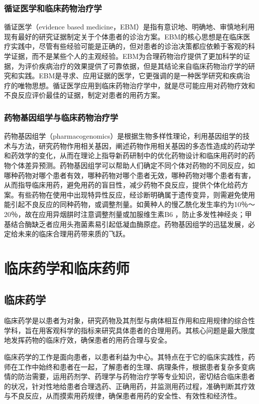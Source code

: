 \subsubsection{循证医学和临床药物治疗学}

循证医学（evidence based
medicine，EBM）是指有意识地、明确地、审慎地利用现有最好的研究证据制定关于个体患者的诊治方案。EBM的核心思想是在临床医疗实践中，尽管有些经验可能是正确的，但对患者的诊治决策都应依赖于客观的科学证据，而不是某些个人的主观经验。EBM为合理药物治疗提供了更加科学的证据，为评价疾病治疗的效果提供了可靠依据，但是其结论来自临床药物治疗学的研究和实践。EBM是寻求、应用证据的医学，它更强调的是一种医学研究和疾病治疗的唯物思想。循证医学应用到临床药物治疗学中，就是尽可能应用对药物疗效和不良反应评价最佳的证据，制定对患者的用药方案。

\subsubsection{药物基因组学与临床药物治疗学}

药物基因组学（pharmacogenomics）是根据生物多样性理论，利用基因组学的技术与方法，研究药物作用相关基因，阐述药物作用相关基因的多态性造成的药动学和药效学的变化，从而在理论上指导新药研制中的优化药物设计和临床用药时的药物个体差异预测。药物基因组学可以帮助人们确定不同个体对药物的不同反应，如哪种药物对哪个患者有效，哪种药物对哪个患者无效，哪种药物对哪个患者有害，从而指导临床用药，避免用药的盲目性，减少药物不良反应，提供个体化给药方案。有些药物在使用中出现特异性反应，经诊断明确属于遗传变异，则需避免使用能引起不良反应的同种药物，或调整剂量。如黄种人的慢乙酰化发生率约为10％～20％，故在应用异烟肼时注意调整剂量或加服维生素B{6}
，防止多发性神经炎；甲基结合酶缺乏者应用头孢菌素易引起低凝血酶原症。药物基因组学的迅猛发展，必定给未来的临床合理用药带来质的飞跃。

\section{临床药学和临床药师}

\subsection{临床药学}

临床药学是以患者为对象，研究药物及其剂型与病体相互作用和应用规律的综合性学科，旨在用客观科学的指标来研究具体患者的合理用药。其核心问题是最大限度地发挥药物的临床疗效，确保患者的用药合理与安全。

临床药学的工作是面向患者，以患者利益为中心。其特点在于它的临床实践性，药师在工作中始终和患者在一起，了解患者的生理、病理条件，根据患者复杂多变病情的防治需要，运用药剂学、药理学与药物治疗学等专业知识，密切结合临床患者的状况，针对性地给患者合理选药、正确用药，并监测用药过程，准确判断其疗效与不良反应，从而摸索用药规律，确保患者用药的安全性、有效性和经济性。


